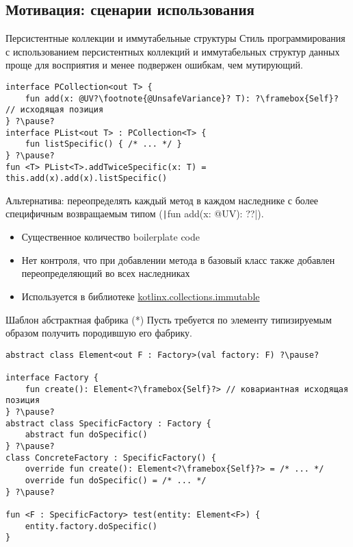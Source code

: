 \documentclass[handout,aspectratio=169,usenames,dvipsnames]{beamer}
\begin{document}
\subsection{Мотивация: сценарии использования}

\begin{frame}[fragile]{Персистентные коллекции и иммутабельные структуры}
    Стиль программирования с использованием персистентных коллекций и иммутабельных структур данных проще для восприятия и менее подвержен ошибкам, чем мутирующий. \pause

    \begin{verbatim}
interface PCollection<out T> {
    fun add(x: @UV?\footnote{@UnsafeVariance}? T): ?\framebox{Self}? // исходящая позиция
} ?\pause?
interface PList<out T> : PCollection<T> {
    fun listSpecific() { /* ... */ }
} ?\pause?
fun <T> PList<T>.addTwiceSpecific(x: T) = this.add(x).add(x).listSpecific()
    \end{verbatim}

    \pause
    \vspace{0.5em}
    Альтернатива: переопределять каждый метод в каждом наследнике с более специфичным возвращаемым типом (\texttt|fun add(x: @UV): ??|).
    \begin{itemize}
        \item Существенное количество boilerplate code
        \item Нет контроля, что при добавлении метода в базовый класс также добавлен переопределяющий во всех наследниках
        \item Используется в библиотеке \href{https://github.com/Kotlin/kotlinx.collections.immutable}{\color{blue}kotlinx.collections.immutable}
    \end{itemize}
\end{frame}

\begin{frame}[fragile]{Шаблон абстрактная фабрика (*)}
    Пусть требуется по элементу типизируемым образом получить породившую его фабрику.

    \begin{verbatim}
abstract class Element<out F : Factory>(val factory: F) ?\pause?

interface Factory {
    fun create(): Element<?\framebox{Self}?> // ковариантная исходящая позиция
} ?\pause?
abstract class SpecificFactory : Factory {
    abstract fun doSpecific()
} ?\pause?
class ConcreteFactory : SpecificFactory() {
    override fun create(): Element<?\framebox{Self}?> = /* ... */
    override fun doSpecific() = /* ... */
} ?\pause?

fun <F : SpecificFactory> test(entity: Element<F>) {
    entity.factory.doSpecific()
}
    \end{verbatim}
\end{frame}
\end{document}
